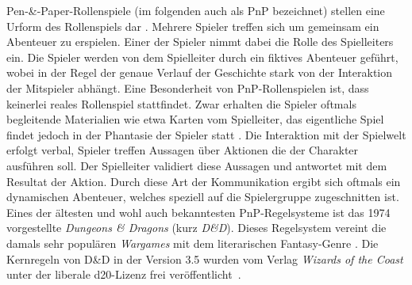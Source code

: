 \addtocounter{footnote}{1}

Pen-\&-Paper-Rollenspiele (im folgenden auch als PnP bezeichnet) stellen eine Urform des Rollenspiels dar \cite{Apperley2006}. Mehrere Spieler treffen sich um gemeinsam ein Abenteuer zu erspielen. Einer der Spieler nimmt dabei die Rolle des Spielleiters ein. Die Spieler werden von dem Spielleiter durch ein fiktives Abenteuer geführt, wobei in der Regel der genaue Verlauf der Geschichte stark von der Interaktion der Mitspieler abhängt. \cite{Apperley2006}\newline 
Eine Besonderheit von PnP-Rollenspielen ist, dass keinerlei reales Rollenspiel stattfindet. Zwar erhalten die Spieler oftmals begleitende Materialien wie etwa Karten vom Spielleiter, das eigentliche Spiel findet jedoch in der Phantasie der Spieler statt \cite{Copier2005}. Die Interaktion mit der Spielwelt erfolgt verbal, Spieler treffen Aussagen über Aktionen die der Charakter ausführen soll. Der Spielleiter validiert diese Aussagen und antwortet mit dem Resultat der Aktion. Durch diese Art der Kommunikation ergibt sich oftmals ein dynamischen Abenteuer, welches speziell auf die Spielergruppe zugeschnitten ist. \cite{Drachen2008}\newline
Eines der ältesten und wohl auch bekanntesten PnP-Regelsysteme ist das 1974 vorgestellte \emph{Dungeons \& Dragons} (kurz \emph{D\&D}). Dieses Regelsystem vereint die damals sehr populären \emph{Wargames} mit dem literarischen Fantasy-Genre \cite{Copier2005}. Die Kernregeln von D\&D in der Version 3.5 wurden vom Verlag \emph{Wizards of the Coast} unter der liberale d20-Lizenz frei veröffentlicht~\cite{SRD35}.


